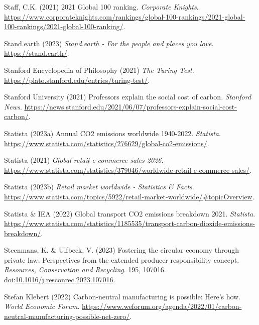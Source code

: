 \documentclass[
  letterpaper,
  DIV=11,
  numbers=noendperiod]{scrartcl}
\newlength{\cslhangindent}
\newenvironment{CSLReferences}[2] %
 {\begin{list}{}{%
  \setlength{\itemindent}{0pt}
  \setlength{\leftmargin}{0pt}
  \setlength{\parsep}{0pt}
  \ifodd #1
   \setlength{\leftmargin}{\cslhangindent}
   \setlength{\itemindent}{-1\cslhangindent}
  \fi
  \setlength{\itemsep}{#2\baselineskip}}}
 {\end{list}}
\begin{document}
\begin{CSLReferences}{0}{1}
Staff, C.K. (2021) 2021 {Global} 100 ranking. \emph{Corporate Knights}.
\url{https://www.corporateknights.com/rankings/global-100-rankings/2021-global-100-rankings/2021-global-100-ranking/}.

Stand.earth (2023) \emph{Stand.earth - {For} the people and places you
love}. \url{https://stand.earth/}.

Stanford Encyclopedia of Philosophy (2021) \emph{The {Turing Test}}.
\url{https://plato.stanford.edu/entries/turing-test/}.

Stanford University (2021) Professors explain the social cost of carbon.
\emph{Stanford News}.
\url{https://news.stanford.edu/2021/06/07/professors-explain-social-cost-carbon/}.

Statista (2023a) Annual {CO2} emissions worldwide 1940-2022.
\emph{Statista}.
\url{https://www.statista.com/statistics/276629/global-co2-emissions/}.

Statista (2021) \emph{Global retail e-commerce sales 2026}.
\url{https://www.statista.com/statistics/379046/worldwide-retail-e-commerce-sales/}.

Statista (2023b) \emph{Retail market worldwide - {Statistics} \&
{Facts}}.
\url{https://www.statista.com/topics/5922/retail-market-worldwide/\#topicOverview}.

Statista \& IEA (2022) Global transport {CO2} emissions breakdown 2021.
\emph{Statista}.
\url{https://www.statista.com/statistics/1185535/transport-carbon-dioxide-emissions-breakdown/}.

Steenmans, K. \& Ulfbeck, V. (2023) Fostering the circular economy
through private law: {Perspectives} from the extended producer
responsibility concept. \emph{Resources, Conservation and Recycling}.
195, 107016.
doi:\href{https://doi.org/10.1016/j.resconrec.2023.107016}{10.1016/j.resconrec.2023.107016}.

Stefan Klebert (2022) Carbon-neutral manufacturing is possible: Here's
how. \emph{World Economic Forum}.
\url{https://www.weforum.org/agenda/2022/01/carbon-neutral-manufacturing-possible-net-zero/}.


\end{CSLReferences}
\end{document}
